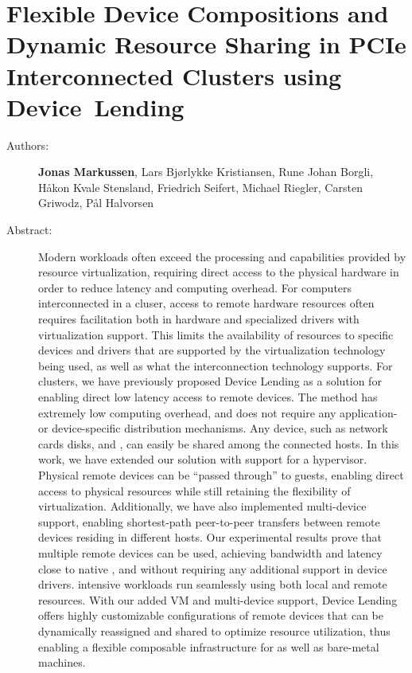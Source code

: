 \chapter{Flexible Device Compositions and Dynamic Resource Sharing in PCIe Interconnected Clusters using Device~Lending}
\label{paper:CC}
\paperthumb

\begin{description}
	\item[Authors:]
		\textbf{Jonas Markussen}, Lars Bj{\o}rlykke Kristiansen, Rune Johan Borgli, H{\aa}kon Kvale Stensland,
		Friedrich Seifert, Michael Riegler, Carsten Griwodz, P{\aa}l Halvorsen

	\item[Abstract:]
		Modern workloads often exceed the processing and  capabilities provided by resource virtualization,
		requiring direct access to the physical hardware in order to reduce latency and computing overhead.
		For computers interconnected in a cluser, access to remote hardware resources often requires facilitation
		both in hardware and specialized drivers with virtualization support. This limits the availability of
		resources to specific devices and drivers that are supported by the virtualization technology being used, as
		well as what the interconnection technology supports.
		For  clusters, we have previously proposed Device Lending as a solution for enabling direct
		low latency access to remote devices.
		The method has extremely low computing overhead, and does not
		require any application- or device-specific distribution mechanisms. Any  device, such as network cards disks, and
		, can easily be shared among the connected hosts.
		In this work, we have extended our solution with support for a  hypervisor.
		Physical remote devices can be  ``passed through'' to  guests, enabling direct access to physical resources 
		while still retaining the flexibility of virtualization. Additionally, we have also implemented multi-device
		support, enabling shortest-path peer-to-peer transfers between remote devices residing in different hosts.
		Our experimental results prove that multiple remote devices can be used, achieving bandwidth and latency
		close to native , and without requiring any additional support in device drivers. 
		 intensive workloads run seamlessly using both local and remote resources.
		With our added VM and multi-device support, Device Lending offers highly customizable 
		configurations of remote devices that can be dynamically reassigned and shared to optimize resource 
		utilization, thus enabling a flexible composable  infrastructure for  as well as bare-metal
		machines.


\end{description}
